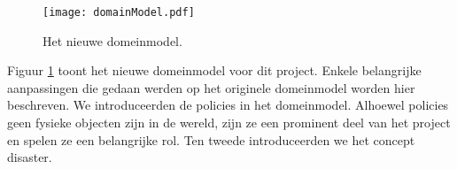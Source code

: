 \label{domeinmodel}
\begin{figure}[htb]
\centering
\texttt{[image: domainModel.pdf]}
\caption{Het nieuwe domeinmodel.}
\label{fig:newDomainModel}
\end{figure}
Figuur \ref{fig:newDomainModel} toont het nieuwe domeinmodel voor dit project. Enkele belangrijke aanpassingen die gedaan werden op het originele domeinmodel worden hier beschreven. We introduceerden de policies in het domeinmodel. Alhoewel policies geen fysieke objecten zijn in de wereld, zijn ze een prominent deel van het project en spelen ze een belangrijke rol. Ten tweede introduceerden we het concept disaster.